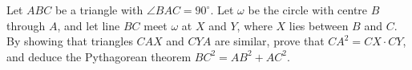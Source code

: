 Let $ABC$ be a triangle with $\angle BAC=90^\circ$. Let $\omega$ be the circle with centre $B$ through $A$, and let line $BC$ meet $\omega$ at $X$ and $Y$, where $X$ lies between $B$ and $C$. By showing that triangles $CAX$ and $CYA$ are similar, prove that $CA^2=CX\cdot CY$, and deduce the Pythagorean theorem $BC^2=AB^2+AC^2$.
